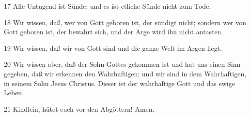\par 17 Alle Untugend ist Sünde; und es ist etliche Sünde nicht zum Tode.
\par 18 Wir wissen, daß, wer von Gott geboren ist, der sündigt nicht; sondern wer von Gott geboren ist, der bewahrt sich, und der Arge wird ihn nicht antasten.
\par 19 Wir wissen, daß wir von Gott sind und die ganze Welt im Argen liegt.
\par 20 Wir wissen aber, daß der Sohn Gottes gekommen ist und hat uns einen Sinn gegeben, daß wir erkennen den Wahrhaftigen; und wir sind in dem Wahrhaftigen, in seinem Sohn Jesus Christus. Dieser ist der wahrhaftige Gott und das ewige Leben.
\par 21 Kindlein, hütet euch vor den Abgöttern! Amen.

